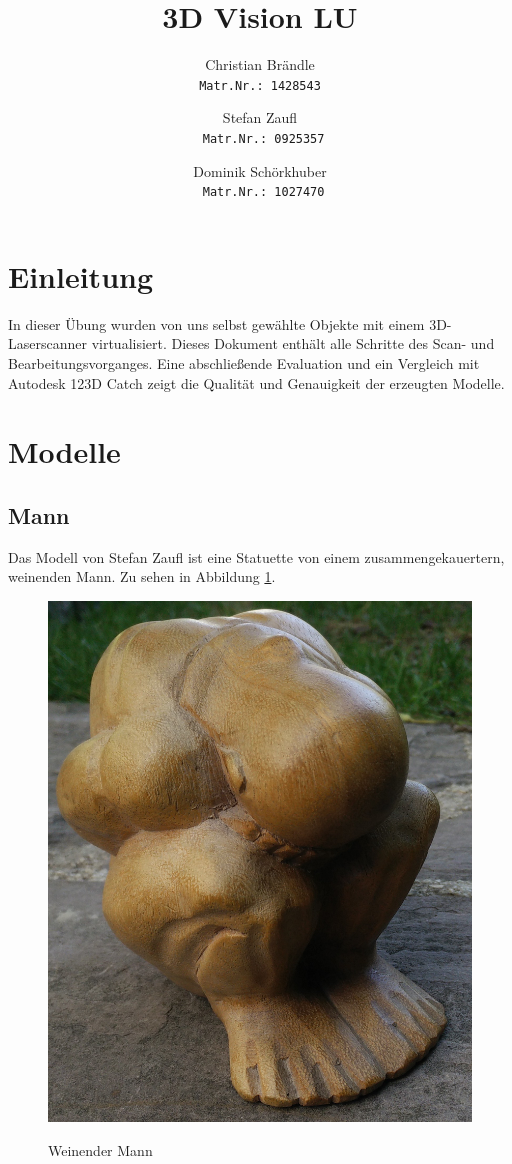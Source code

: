 \documentclass[]{article}
\title{3D Vision LU}
\author{Christian Br\"andle \\
\texttt{Matr.Nr.: 1428543}
\and Stefan Zaufl \\
\texttt{ Matr.Nr.: 0925357}
\and Dominik Sch\"orkhuber\\
\texttt{ Matr.Nr.: 1027470}}
\begin{document}
\maketitle


\section{Einleitung}  %
In dieser Übung wurden von uns selbst gewählte Objekte mit einem 3D-Laserscanner virtualisiert. Dieses Dokument enthält alle Schritte des Scan- und Bearbeitungsvorganges. Eine abschließende Evaluation und ein Vergleich mit Autodesk 123D Catch zeigt die Qualität und Genauigkeit der erzeugten Modelle. 

\section{Modelle}
\subsection{}
\subsection{Mann}
Das Modell von Stefan Zaufl ist eine Statuette von einem zusammengekauertern, weinenden Mann. Zu sehen in Abbildung \ref{fig:man:orig}.
\begin{figure}[H]
\caption{Weinender Mann}
\centering
\includegraphics[scale=0.11]{images/Mann_Original.jpg}
\label{fig:man:orig}
\end{figure}
\end{document}
